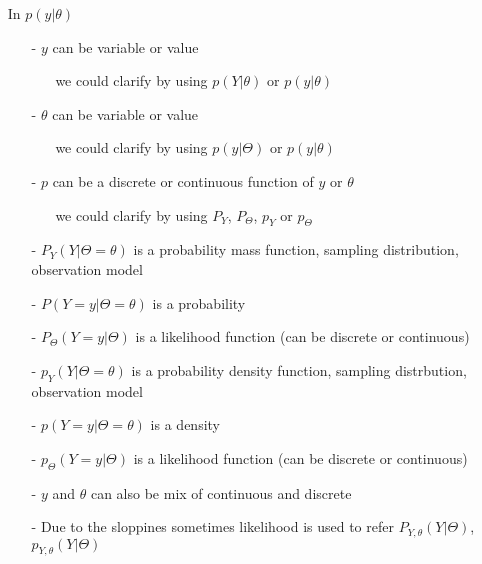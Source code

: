 \documentclass[a4paper,11pt,english]{article}
\begin{document}
  \begin{itemize}
  \item[] In $p(y|\theta)$
  \begin{itemize}
  \item[-] $y$ can be variable or value
    \begin{itemize}
    \item[] we could clarify by using $p(Y|\theta)$ or $p(y|\theta)$
    \end{itemize}
  \item[-] $\theta$ can be variable or value
    \begin{itemize}
    \item[] we could clarify by using $p(y|\Theta)$ or $p(y|\theta)$
    \end{itemize}
  \item[-] $p$ can be a discrete or continuous function of $y$ or $\theta$
    \begin{itemize}
    \item[] we could clarify by using $P_Y$, $P_\Theta$, $p_Y$ or $p_\Theta$
    \end{itemize}
\item[-]
  $P_Y(Y|\Theta=\theta)$ is a probability mass function, sampling distribution, observation model
\item[-]
$P(Y=y|\Theta=\theta)$ is a probability
\item[-]
$P_\Theta(Y=y|\Theta)$ is a likelihood function (can be discrete or continuous)
\item[-] $p_Y(Y|\Theta=\theta)$ is a probability density function, sampling distrbution, observation model
\item[-] $p(Y=y|\Theta=\theta)$ is a density
\item[-] $p_\Theta(Y=y|\Theta)$ is a likelihood function (can be discrete or continuous)
  \item[-] $y$ and $\theta$ can also be mix of continuous and discrete
    \item[-] Due to the sloppines sometimes likelihood is used to refer
$P_{Y,\theta}(Y|\Theta)$, $p_{Y,\theta}(Y|\Theta)$

  \end{itemize}
\end{itemize}
\end{document}
